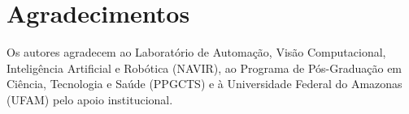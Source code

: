 \section*{Agradecimentos}

Os autores agradecem ao Laboratório de Automação, Visão Computacional, Inteligência Artificial e Robótica (NAVIR), ao Programa de Pós-Graduação em Ciência, Tecnologia e Saúde (PPGCTS) e à Universidade Federal do Amazonas (UFAM) pelo apoio institucional.
